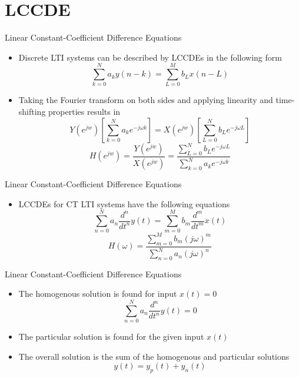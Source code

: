 \section{LCCDE}

\begin{frame}{Linear Constant-Coefficient Difference Equations}

    \begin{itemize}
        \item Discrete LTI systems can be described by LCCDEs in the following form
            \[
                \sum_{k=0}^N a_{k}y(n-k) = \sum_{L=0}^M b_{L}x(n-L)
            \]
        \item Taking the Fourier transform on both sides and applying linearity and time-shifting properties results in
            \[
                Y(e^{jw})[\sum_{k=0}^N a_{k}e^{-j\omega k}] = X(e^{jw})[\sum_{L=0}^N b_{L}e^{-j\omega L}]
            \]
            \[
                H(e^{jw}) = \frac{Y(e^{jw})}{X(e^{jw})} = \frac{\sum_{L=0}^N b_{L}e^{-j\omega L}}{\sum_{k=0}^N a_{k}e^{-j\omega k}}
            \]
    \end{itemize}

\end{frame}

\begin{frame}{Linear Constant-Coefficient Difference Equations}
    \begin{itemize}
        \item LCCDEs for CT LTI systems have the following equations
            \[
                \sum_{n=0}^N a_n \frac{d^{n}}{dt^n} y(t) = \sum_{m=0}^M b_m \frac{d^{m}}{dt^m} x(t)
            \]
            \[
                H(\omega) = \frac{\sum_{m=0}^M b_m (j\omega)^m} {\sum_{n=0}^N a_n (j\omega)^n}
            \]
    \end{itemize}

\end{frame}

\begin{frame}{Linear Constant-Coefficient Difference Equations}
    \begin{itemize}
        \item The homogenous solution is found for input $x(t) = 0$
            \[
                \sum_{n=0}^N a_n \frac{d^{n}}{dt^n} y(t) = 0
            \]
        \item The particular solution is found for the given input $x(t)$
        \item The overall solution is the sum of the homogenous and particular solutions
        \[ y(t) = y_p(t) + y_n(t)
        \]
    \end{itemize}

\end{frame}

